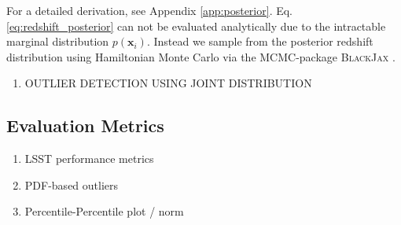 For a detailed derivation, see Appendix \ref{app:posterior}. Eq. \ref{eq:redshift_posterior} can not be evaluated analytically due to the intractable marginal distribution $p(\mathbf{x}_i)$. Instead we sample from the posterior redshift distribution using Hamiltonian Monte Carlo via the MCMC-package \textsc{BlackJax} \citep{blackjax2020github}.

\begin{enumerate}
    \item OUTLIER DETECTION USING JOINT DISTRIBUTION
\end{enumerate}

\subsection{Evaluation Metrics}

\begin{enumerate}
    \item LSST performance metrics
    \item PDF-based outliers
    \item Percentile-Percentile plot / norm
\end{enumerate}

